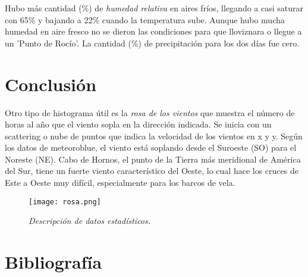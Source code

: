 \documentclass[12pt]{article}
\begin{document}
Hubo m\'as cantidad (\%) de \emph{humedad relativa} en aires fr\'ios, llegando a casi saturar con 65\% y bajando a 22\% cuando la temperatura sube. Aunque hubo mucha humedad en aire fresco no se dieron las condiciones para que lloviznara o llegue a un 'Punto de Roc\'io'. La cantidad (\%) de precipitaci\'on para los dos d\'ias fue cero. 

\section{Conclusi\'on}
\noindent
Otro tipo de histograma \'util es la \emph{rosa de los vientos} que muestra el número de horas al año que el viento sopla en la dirección indicada. Se inicia con un scattering o nube de puntos que indica la velocidad de los vientos en x y y. Seg\'un los datos de meteoroblue,  el viento est\'a soplando desde el Suroeste (SO) para el Noreste (NE). Cabo de Hornos, el punto de la Tierra m\'as meridional de Am\'erica del Sur, tiene un fuerte viento caracter\'istico del Oeste, lo cual hace los cruces de Este a Oeste muy dif\'icil, especialmente para los barcos de vela.
\begin{figure}[H]
\texttt{[image: rosa.png]}
\centering
\caption{\emph{\scriptsize{Descripci\'on de datos estad\'isticos.}}}
\end{figure}


\pagebreak
\section{Bibliograf\'ia}
\noindent
\end{document}
